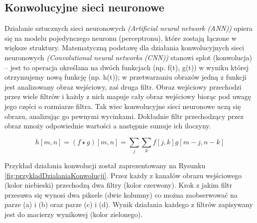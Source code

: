 \documentclass[a4paper,12pt]{article}
\newcommand\spacingIndent{2.2em}
\begin{document}
    \subsection{Konwolucyjne sieci neuronowe}
        \hspace{\spacingIndent} Działanie sztucznych sieci neuronowych \textit{(Artificial neural network (ANN))} opiera się na modelu pojedynczego     
			neuronu (perceptronu), które zostają łączone w większe struktury. Matematyczną podstawę dla działania konwolucyjnych sieci neuronowych 
			\textit{(Convolutional neural networks (CNN))} stanowi splot (konwolucja) -- jest to operacja określana na dwóch funkcjach (np. f(t), g(t)) 
			w wyniku której otrzymujemy nową funkcję (np. h(t)); w przetwarzaniu obrazów jedną z funkcji jest analizowany obraz wejściowy, zaś druga filtr.
            Obraz wejściowy przechodzi przez wiele filtrów i każdy z nich mapuje cały obraz wejściowy biorąc pod uwagę jego części o rozmiarze filtra. 
			Tak wiec konwolucyjne sieci neuronowe uczą się obrazu, analizując go pewnymi wycinkami. Dokładnie filtr przechodzący przez obraz 
			mnoży odpowiednie wartości a następnie sumuje ich iloczyny.
			
			
        
            \begin{displaymath}
                h[m, n] = ( f \star g)[m, n] = \sum\limits_{j}\sum\limits_{k}f[j, k]g[m-j, n-k]
            \end{displaymath}
            
            Przykład działania konwolucji został zaprezentowany na Rysunku \ref{fig:przykladDzialaniaKonwolucji}. 
            Przez każdy z kanałów obrazu wejściowego (kolor niebieski) przechodzą dwa filtry (kolor czerwony). Krok z jakim filtr przesuwa się wynosi dwa piksele (dwie kolumny) co można zaobserwować na parze (a) i (b) oraz parze (c) i (d). Wynik działania każdego z filtrów zapisywany jest do macierzy wynikowej (kolor zielonego). 
            
            
		    \newpage
		    
\end{document}
